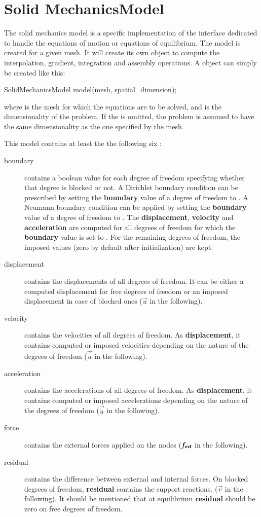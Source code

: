 \chapter{Solid MechanicsModel\label{sect:smm}}

The solid mechanics model is a specific implementation of the
 interface dedicated to handle the equations of motion or
equations of equilibrium. The model is created for a given mesh.  It
will create its own  object to compute the interpolation,
gradient, integration and assembly operations.  A
 object can simply be created like this:
\begin{cpp} 
SolidMechanicsModel model(mesh, spatial_dimension);
\end{cpp} 
where  is the mesh for which the equations are to be
solved, and  is the dimensionality of the
problem.  If the  is omitted, the problem is
assumed to have the same dimensionality as the one specified by the
mesh.

This model contains at least the the following six :
\begin{description}
\item[boundary] contains a boolean value for each degree of freedom
  specifying whether that degree is blocked or not. A Dirichlet
  boundary condition can be prescribed by setting the
  \textbf{boundary} value of a degree of freedom to .  A
  Neumann boundary condition can be applied by setting the
  \textbf{boundary} value of a degree of freedom to .  The
  \textbf{displacement}, \textbf{velocity} and \textbf{acceleration}
  are computed for all degrees of freedom for which the
  \textbf{boundary} value is set to . For the remaining
  degrees of freedom, the imposed values (zero by default after
  initialization) are kept.
\item[displacement] contains the displacements of all degrees of
  freedom. It can be either a computed displacement for free degrees
  of freedom or an imposed displacement in case of blocked ones
  ($\vec{u}$ in the following).
\item[velocity] contains the velocities of all degrees of freedom.  As
  \textbf{displacement}, it contains computed or imposed velocities
  depending on the nature of the degrees of freedom ($\vec{\dot{u}}$
  in the following).
\item[acceleration] contains the accelerations of all degrees of
  freedom. As \textbf{displacement}, it contains computed or imposed
  accelerations depending on the nature of the degrees of freedom
  ($\vec{\ddot{u}}$ in the following).
\item[force] contains the external forces applied on the nodes
  ($\boldsymbol{f_{{\mathrm{ext}}}}$ in the following).
\item[residual] contains the difference between external and internal
  forces. On blocked degrees of freedom, \textbf{residual} contains
  the support reactions.  ($\vec{r}$ in the following).  It should be
  mentioned that at equilibrium \textbf{residual} should be zero on
  free degrees of freedom.
\end{description}

